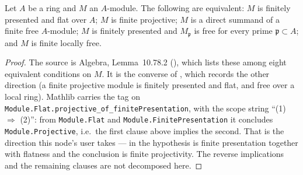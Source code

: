 \begin{lemma}
\label{lem:pc-fp-flat-finite-projective}
Let $A$ be a ring and $M$ an $A$-module.  The following are equivalent:
$M$ is finitely presented and flat over $A$; $M$ is finite projective;
$M$ is a direct summand of a finite free $A$-module; $M$ is finitely
presented and $M_{\mathfrak p}$ is free for every prime
$\mathfrak p\subset A$; and $M$ is finite locally free.
\mathlibok\ 
\end{lemma}
\begin{proof}
The source is Algebra, Lemma~10.78.2 (), which
lists these among eight equivalent conditions on $M$.  It is the
converse of , which records the
other direction (a finite projective module is finitely presented and
flat, and free over a local ring).  Mathlib carries the tag on
\texttt{Module.Flat.projective\_of\_finitePresentation}, with the scope
string ``(1) $\Rightarrow$ (2)'': from \texttt{Module.Flat} and
\texttt{Module.FinitePresentation} it concludes
\texttt{Module.Projective}, i.e.\ the first clause above implies the
second.  That is the direction this node's user takes --- in
 the hypothesis is finite presentation
together with flatness and the conclusion is finite projectivity.  The
reverse implications and the remaining clauses are not decomposed
here.
\end{proof}

